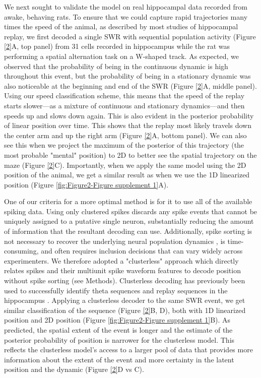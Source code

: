 \documentclass[times, twoside]{zHenriquesLab-StyleBioRxiv}
\begin{document}
We next sought to validate the model on real hippocampal data recorded from awake, behaving rats. To ensure that we could capture rapid trajectories many times the speed of the animal, as described by most studies of hippocampal replay, we first decoded a single SWR with sequential population activity (Figure \ref{2}A, top panel) from 31 cells recorded in hippocampus while the rat was performing a spatial alternation task on a W-shaped track. As expected, we observed that the probability of being in the continuous dynamic is high throughout this event, but the probability of being in a stationary dynamic was also noticeable at the beginning and end of the SWR (Figure \ref{2}A, middle panel). Using our speed classification scheme, this means that the speed of the replay starts slower---as a mixture of continuous and stationary dynamics---and then speeds up and slows down again. This is also evident in the posterior probability of linear position over time. This shows that the replay most likely travels down the center arm and up the right arm (Figure \ref{2}A, bottom panel). We can also see this when we project the maximum of the posterior of this trajectory (the most probable "mental" position) to 2D to better see the spatial trajectory on the maze (Figure \ref{2}C). Importantly, when we apply the same model using the 2D position of the animal, we get a similar result as when we use the 1D linearized position (Figure \ref{fig:Figure2-Figure supplement 1}A).

One of our criteria for a more optimal method is for it to use all of the available spiking data. Using only clustered spikes discards any spike events that cannot be uniquely assigned to a putative single neuron, substantially reducing the amount of information that the resultant decoding can use. Additionally, spike sorting is not necessary to recover the underlying neural population dynamics \cite{TrautmannAccurateEstimationNeural2019}, is time-consuming, and often requires inclusion decisions that can vary widely across experimenters. We therefore adopted a "clusterless" approach which directly relates spikes and their multiunit spike waveform features to decode position without spike sorting (see Methods). Clusterless decoding has previously been used to successfully identify theta sequences and replay sequences in the hippocampus \cite{KloostermanBayesiandecodingusing2014, ChenTransductiveneuraldecoding2012,DengRapidclassificationhippocampal2016, KayConstantSubsecondCycling2020}. Applying a clusterless decoder to the same SWR event, we get similar classification of the sequence (Figure \ref{2}B, D), both with 1D linearized position and 2D position (Figure \ref{fig:Figure2-Figure supplement 1}B). As predicted, the spatial extent of the event is longer and the estimate of the posterior probability of position is narrower for the clusterless model. This reflects the clusterless model's access to a larger pool of data that provides more information about the extent of the event and more certainty in the latent position and the dynamic (Figure \ref{2}D vs C).
\end{document}
